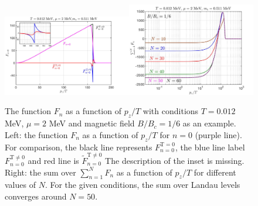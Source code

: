 \documentclass[sn-mathphys,Numbered]{sn-jnl}
\newcommand{\rev}[1]{{\color{blue}#1}}
\begin{document}
\begin{figure}[ht]
\centering
\includegraphics[width=0.5\textwidth]{./plot/NewFermi_Background}\includegraphics[width=0.5\textwidth]{./plot/NewFermi_SumChecking}
\caption{ The function $F_n$ as a function of $p_z/T$ with conditions $T=0.012$ MeV, $\mu=2$ MeV and magnetic field $B/B_c=1/6$ as an example.
Left: the function $F_n$ as a function of $p_z/T$ for $n=0$ (purple line). For comparison, the black line represents $F_{n=0}^{\mathrm{T=0}}$, the blue line label $F_{n=0}^{\mathrm{T\neq0}}$ and red line is $\tilde F_{n=0}^{\mathrm{T\neq0}}$ \rev{The description of the inset is missing}. Right: the sum over $\sum_{n=1}^NF_n$ as a function of $p_z/T$ for different values of $N$. For the given conditions, the sum over Landau levels converges around $N=50$.}
\label{F0_Checking}
\end{figure}
\end{document}
